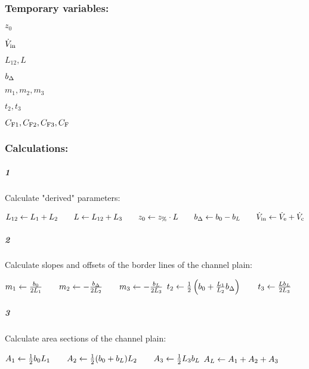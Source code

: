 \subsubsection*{Temporary variables:}
\begin{multicols}{3}
  \begin{packed_item}
    \item $z_0$
    \item $\dot{V}_\text{in}$
    \item $L_{12}, L$  
    \item $b_\Delta$
    \item $m_1, m_2, m_3$
    \item $t_2, t_3$
    \item $C_\text{F1}, C_\text{F2}, C_\text{F3}, C_\text{F}$
  \end{packed_item}
\end{multicols}
\subsubsection*{Calculations:}
\subparagraph{1}
Calculate "derived" parameters:
\begin{algorithmic}
  \State $L_{12} \leftarrow L_1 + L_2
  \qquad L \leftarrow L_{12} + L_3
  \qquad z_0 \leftarrow z_\text{\%} \cdot L
  \qquad b_\Delta \leftarrow  b_0 - b_L
  \qquad \dot{V}_\text{in} \leftarrow \dot{V}_\text{e} + \dot{V}_\text{c}
  $
\end{algorithmic}
\subparagraph{2}
Calculate slopes and offsets of the border lines of the channel plain:
\begin{algorithmic}
  \State $       m_1 \leftarrow   \frac{b_0}{2L_1}
  \qquad m_2 \leftarrow - \frac{b_\Delta}{2L_2}
  \qquad m_3 \leftarrow - \frac{b_L}{2L_3}
  $\vspace*{.5ex}
  \State $           t_2 \leftarrow \frac{1}{2} \left( b_0 +  \frac{L_1}{L_2}b_\Delta \right)
  \qquad t_3 \leftarrow \frac{L b_L}{2 L_3 }
  $\vspace*{.5ex}
\end{algorithmic}
\subparagraph{3}
Calculate area sections of the channel plain:
\begin{algorithmic}
  \State $       A_1 \leftarrow \frac{1}{2} b_0  L_1  
  \qquad A_2 \leftarrow  \frac{1}{2} (b_0 + b_L) L_2  
  \qquad A_3 \leftarrow \frac{1}{2} L_3b_L  
  $\vspace*{.5ex}
  \State $  A_L \leftarrow A_1 + A_2 + A_3
  $\vspace*{.5ex}
\end{algorithmic}

